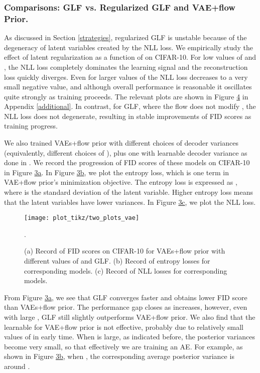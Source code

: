 \documentclass{article}
\begin{document}
\subsubsection{Comparisons: GLF vs. Regularized GLF and VAE+flow Prior.}\label{comparison}




 
As discussed in Section \ref{strategies}, regularized GLF is unstable because of the degeneracy of latent variables created by the NLL loss. We empirically study the effect of latent regularization as a function of  on CIFAR-10. For low values of  and , the NLL loss completely dominates the learning signal and the reconstruction loss quickly diverges. Even for larger values of 
the NLL loss decreases to a very small negative value, and although overall performance is reasonable it oscillates quite strongly as training proceeds. The relevant plots are shown in Figure \hyperref[fig:cifar glf]{4} in Appendix \ref{additional}.
In contrast, for GLF, where the flow does not modify , the NLL loss does not degenerate, resulting in stable improvements of FID scores as training progress. 

We also trained VAEs+flow prior with different choices of decoder variances (equivalently, different choices of ), plus one with learnable decoder variance as done in \citep{TwoVAE}. We record the progression of FID scores of these models on CIFAR-10 in Figure \hyperref[fig:4]{3a}.
In Figure \hyperref[fig:4]{3b}, we plot the entropy loss, which is one term in VAE+flow prior's minimization objective. The entropy loss is expressed as , where  is the standard deviation of the  latent variable. Higher entropy loss means that the latent variables have lower variances. In Figure \hyperref[fig:4]{3c}, we plot the NLL loss. 

\begin{figure}[ht]
\centering
\texttt{[image: plot\_tikz/two\_plots\_vae]}
\caption{(a) Record of FID scores on CIFAR-10 for VAEs+flow prior with different values of  and  GLF. (b) Record of entropy losses for corresponding models. (c) Record of NLL losses for corresponding models.} \label{fig:4}. 
\end{figure}

From Figure \hyperref[fig:4]{3a}, we see that GLF converges faster and obtains lower FID score than VAEs+flow prior. The performance gap closes as  increases, however, even with large , GLF still slightly outperforms VAE+flow prior. We also find that the learnable  for VAE+flow prior is not effective, probably due to relatively small values of  in early time. When  is large, as indicated before, the posterior variances become very small, so that effectively we are training an AE. For example, as shown in Figure \hyperref[fig:4]{3b}, when , the corresponding average posterior variance is around . 
\end{document}
